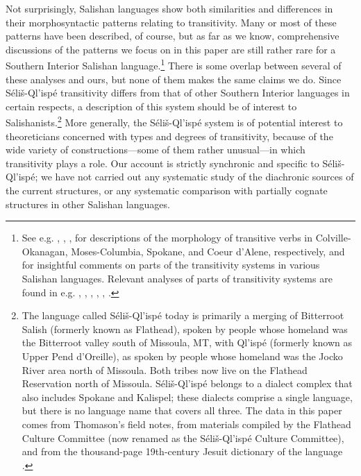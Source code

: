 \documentclass[output=paper,colorlinks,citecolor=brown]{langscibook}
\begin{document}
  Not surprisingly, Salishan languages show both similarities and
  differences in their morphosyntactic patterns relating to
  transitivity.  Many or most of these patterns have been described,
  of course, but as far as we know, comprehensive discussions of the
  patterns we focus on in this paper are still rather rare for a
  Southern Interior Salishan language.\footnote{See e.g.
  \cite{Mattina:1982}, \cite{Kinkade:1981}, \cite{Carlson:1980},
  \cite{Doak:1997} for descriptions of
  the morphology of transitive verbs in Colville-Okanagan,
  Moses-Columbia, Spokane, and Coeur d'Alene, respectively, and
  \cite{Kroeber:1999} for insightful comments on parts of the transitivity
  systems in various Salishan languages.  Relevant analyses of parts
  of transitivity systems are found in e.g. \cite{L.Thomason:1994},
  \cite{Mattina:1994}, \cite{Mattina:2004}, \cite{Dilts:2006},
  \cite{Gerdts&Hukari:1998}, \cite{Sobolak:2020}.}
  There is some overlap between several of these analyses and ours,
  but none of them makes the same claims we do.  Since
  S\'eli\v{s}-Ql'isp\'e transitivity differs from that of other
  Southern Interior languages in certain respects, a description of
  this system should be of interest to Salishanists.\footnote{The
  language called S\'eli\v{s}-Ql'isp\'e today is primarily a merging
  of Bitterroot Salish (formerly known as Flathead), spoken by people
  whose homeland was the Bitterroot valley south of Missoula, MT,
  with Ql'isp\'e (formerly known as Upper Pend d'Oreille), as spoken
  by people whose homeland was the Jocko River area north of
  Missoula.  Both tribes now live on the Flathead Reservation north
  of Missoula.  S\'eli\v{s}-Ql'isp\'e belongs to a dialect complex
  that also includes Spokane and Kalispel; these dialects comprise a
  single language, but there is no language name that covers all
  three.  The data in this paper comes from Thomason's field notes,
  from materials compiled by the Flathead Culture Committee (now
  renamed as the S\'eli\v{s}-Ql'isp\'e Culture Committee), and from
  the thousand-page 19th-century Jesuit dictionary of the language
  \cite{Mengarinietal.:1877}.}  More generally, the
  S\'eli\v{s}-Ql'isp\'e system is of potential interest to
  theoreticians concerned with types and degrees of transitivity,
  because of the wide variety of constructions---some of them
  rather unusual---in which transitivity plays a role.  Our account
  is strictly synchronic and specific to S\'eli\v{s}-Ql'isp\'e; we
  have not carried out any systematic study of the diachronic sources
  of the current structures, or any systematic comparison with
  partially cognate structures in other Salishan languages.
\end{document}

